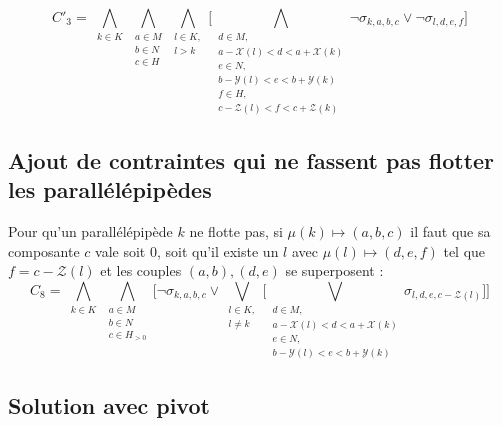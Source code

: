\documentclass[a4paper]{article}
\begin{document}
\begin{equation*}
	C'_3 = 	\bigwedge\limits_{\substack{k\in K}}
			\bigwedge\limits_{\substack{a \in M \\ b \in N \\ c \in H}}
				\bigwedge\limits_{\substack{l\in K,\\ l > k}}
					\bigg[
					\bigwedge\limits_{\substack{d \in M,\\ a-\mathcal{X}(l) < d < a +\mathcal{X}(k) \\  e \in N, \\b-\mathcal{Y}(l) < e < b +\mathcal{Y}(k)\\ f \in H, \\ c-\mathcal{Z}(l) < f < c+\mathcal{Z}(k)}}
						\lnot \sigma_{k,a,b,c} \lor \lnot \sigma_{l,d,e,f}	
					\bigg]
\end{equation*}


\subsection{Ajout de contraintes qui ne fassent pas flotter les parallélépipèdes}
Pour qu'un parallélépipède $k$ ne flotte pas, si $\mu(k) \mapsto (a,b,c)$ il faut que sa composante $c$ vale soit $0$, soit qu'il existe un $l$ avec $\mu(l) \mapsto (d,e,f)$ tel que $f = c - \mathcal{Z}(l)$ et les couples $(a,b), (d,e)$ se superposent :
\begin{equation*}
C_8  = 	\bigwedge\limits_{\substack{k\in K}}
			\bigwedge\limits_{\substack{a \in M \\ b \in N \\ c \in H_{>0}}}
			\bigg[
				\lnot \sigma_{k,a,b,c} \lor
				\bigvee\limits_{\substack{l\in K, \\ l \neq k}}
				\Big[
					\bigvee\limits_{\substack{d \in M,\\ a-\mathcal{X}(l) < d < a +\mathcal{X}(k) \\  e \in N, \\b-\mathcal{Y}(l) < e < b +\mathcal{Y}(k)}}
						\sigma_{l,d,e,c - \mathcal{Z}(l)}	
				\Big]
			\bigg]
\end{equation*}


\subsection{Solution avec pivot}
\end{document}
